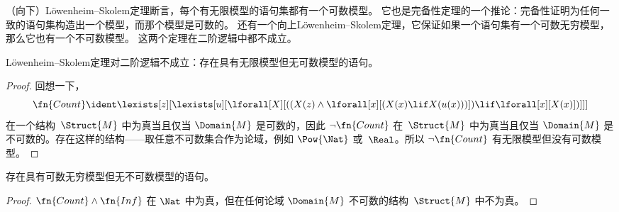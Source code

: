 \documentclass[../../../include/open-logic-section]{subfiles}
\begin{document}


\begin{explain}
（向下）Löwenheim–Skolem定理断言，每个有无限模型的语句集都有一个可数模型。
它也是完备性定理的一个推论：完备性证明为任何一致的语句集构造出一个模型，而那个模型是可数的。
还有一个向上Löwenheim–Skolem定理，它保证如果一个语句集有一个可数无穷模型，那么它也有一个不可数模型。
这两个定理在二阶逻辑中都不成立。
\end{explain}

\begin{thm}
 Löwenheim–Skolem定理对二阶逻辑不成立：存在具有无限模型但无可数模型的语句。
\end{thm}

\begin{proof}
回想一下，
\[
\fn{Count} \ident \lexists[z][\lexists[u][\lforall[X][((X(z) \land
      \lforall[x][(X(x) \lif X(u(x)))]) \lif \lforall[x][X(x)])]]]
\]
在一个结构~$\Struct{M}$ 中为真当且仅当 $\Domain{M}$ 是可数的，因此 $\lnot\fn{Count}$
在~$\Struct{M}$ 中为真当且仅当 $\Domain{M}$ 是不可数的。存在这样的结构——取任意不可数集合作为论域，例如 $\Pow{\Nat}$ 或~$\Real$。所以 $\lnot \fn{Count}$
有无限模型但没有可数模型。
\end{proof}

\begin{thm}
存在具有可数无穷模型但无不可数模型的语句。
\end{thm}

\begin{proof}
$\fn{Count} \land \fn{Inf}$ 在 $\Nat$ 中为真，但在任何论域 $\Domain{M}$ 不可数的结构~$\Struct{M}$ 中不为真。
\end{proof}
\end{document}
